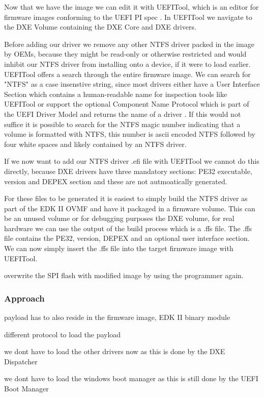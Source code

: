 Now that we have the image we can edit it with UEFITool, which is an editor for firmware images conforming to the UEFI PI spec \cite{uefitool}.
In UEFITool we navigate to the DXE Volume containing the DXE Core and DXE drivers.

Before adding our driver we remove any other NTFS driver packed in the image by OEMs, because they might be read-only or otherwise restricted and would inhibit our NTFS driver from installing onto a device, if it were to load earlier. UEFITool offers a search through the entire firmware image. We can search for "NTFS" as a case insenstive string, since most drivers either have a User Interface Section which contains a human-readable name for inspection tools like UEFITool \cite[Vol 3, 3.2.5]{pi-spec} or support the optional Component Name Protocol which is part of the UEFI Driver Model and returns the name of a driver \cite[11.5]{uefi-spec}. If this would not suffice it is possible to search for the NTFS magic number indicating that a volume is formatted with NTFS, this number is ascii encoded NTFS followed by four white spaces and likely contained by an NTFS driver.

If we now want to add our NTFS driver .efi file with UEFITool we cannot do this directly, because DXE drivers have three mandatory sections: PE32 executable, version and DEPEX section \cite[Vol 3, 2.1.4.1.4]{pi-spec} and these are not autmoatically generated.

For these files to be generated it is easiest to simply build the NTFS driver as part of the EDK II OVMF and have it packaged in a firmware volume. This can be an unused volume or for debugging purposes the DXE volume, for real hardware we can use the output of the build process which is a .ffs file. The .ffs file contains the PE32, version, DEPEX and an optional user interface section.
We can now simply insert the .ffs file into the target firmware image with UEFITool.

overwrite the SPI flash with modified image by using the programmer again.

\subsubsection{Approach}

payload has to also reside in the firmware image, EDK II binary module

different protocol to load the payload

we dont have to load the other drivers now as this is done by the DXE Dispatcher

we dont have to load the windows boot manager as this is still done by the UEFI Boot Manager